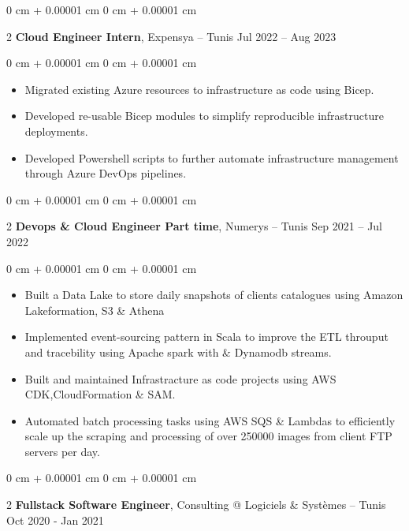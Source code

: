 \documentclass[10pt, letterpaper]{article}
\newenvironment{highlights}{ \begin{itemize}[ topsep=0.10 cm, parsep=0.10 cm, partopsep=0pt,
itemsep=0pt, leftmargin=0 cm + 10pt ] }{ \end{itemize} } %
\newenvironment{onecolentry}{ \begin{adjustwidth}{ 0 cm + 0.00001 cm }{ 0 cm + 0.00001 cm }
}{ \end{adjustwidth} } %
\newenvironment{twocolentry}[2][]{ \onecolentry \def\secondColumn{#2} \setcolumnwidth{\fill, 4.5 cm}
\begin{paracol}{2} }{ \switchcolumn \raggedleft \secondColumn \end{paracol}
\endonecolentry } %
\begin{document}
\vspace{0.3 cm}

\begin{twocolentry}
	{ Jul 2022 – Aug 2023 } \textbf{Cloud Engineer Intern}, Expensya --
	Tunis
\end{twocolentry}

\vspace{0.10 cm}
\begin{onecolentry}
	\begin{highlights}
		\item Migrated existing Azure resources to infrastructure as code using Bicep.
		\item Developed re-usable Bicep modules to simplify reproducible infrastructure deployments.
		\item Developed Powershell scripts to further automate infrastructure management through Azure DevOps pipelines.
	\end{highlights}
\end{onecolentry}


\vspace{0.3 cm}

\begin{twocolentry}
	{ Sep 2021 – Jul 2022 } \textbf{Devops \& Cloud Engineer Part time}, Numerys --
	Tunis
\end{twocolentry}

\vspace{0.10 cm}
\begin{onecolentry}
	\begin{highlights}
		\item Built a Data Lake to store daily snapshots of clients catalogues using Amazon Lakeformation, S3 \& Athena
		\item Implemented event-sourcing pattern in Scala to improve the ETL throuput and tracebility using Apache spark with \& Dynamodb streams.
		\item Built and maintained Infrastracture as code projects using AWS CDK,CloudFormation \& SAM.
		\item Automated batch processing tasks using AWS SQS \& Lambdas to efficiently scale up the scraping and processing of over 250000 images from client FTP servers per day. \
	\end{highlights}
\end{onecolentry}

\vspace{0.3 cm}

\begin{twocolentry}
	{ Oct 2020 - Jan 2021 } \textbf{Fullstack Software Engineer}, Consulting @ Logiciels \& Systèmes --
	Tunis
\end{twocolentry}
\end{document}
